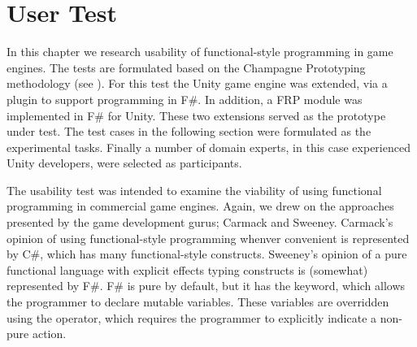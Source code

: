 \chapter{User Test}
In this chapter we research usability of functional-style programming in game engines. The tests are formulated based on the Champagne Prototyping methodology (see ). For this test the Unity game engine was extended, via a plugin to support programming in F\#\cite{fsharp2019plugin}. In addition, a \gls{FRP} module was implemented in F\# for Unity. These two extensions served as the prototype under test. The test cases in the following section were formulated as the experimental tasks. Finally a number of domain experts, in this case experienced Unity developers, were selected as participants. 

The usability test was intended to examine the viability of using functional programming in commercial game engines. Again, we drew on the approaches presented by the game development gurus; Carmack and Sweeney. Carmack's opinion of using functional-style programming whenver convenient is represented by C\#, which has many functional-style constructs. Sweeney's opinion of a pure functional language with explicit effects typing constructs is (somewhat) represented by F\#. F\# is pure by default, but it has the  keyword, which allows the programmer to declare mutable variables. These variables are overridden using the \ttt{\textless-} operator, which requires the programmer to explicitly indicate a non-pure action.





